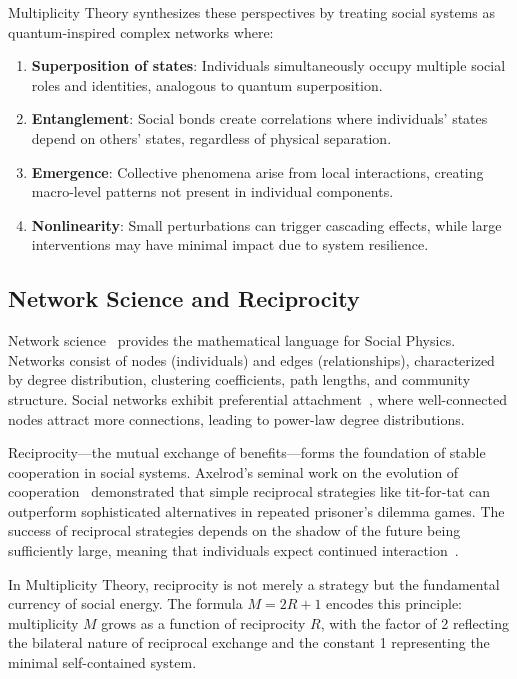 \documentclass[11pt,a4paper]{article}
\begin{document}
Multiplicity Theory synthesizes these perspectives by treating social systems as quantum-inspired complex networks where:

\begin{enumerate}
    \item \textbf{Superposition of states}: Individuals simultaneously occupy multiple social roles and identities, analogous to quantum superposition.
    \item \textbf{Entanglement}: Social bonds create correlations where individuals' states depend on others' states, regardless of physical separation.
    \item \textbf{Emergence}: Collective phenomena arise from local interactions, creating macro-level patterns not present in individual components.
    \item \textbf{Nonlinearity}: Small perturbations can trigger cascading effects, while large interventions may have minimal impact due to system resilience.
\end{enumerate}

\subsection{Network Science and Reciprocity}

Network science~\cite{barabasi2016,newman2010} provides the mathematical language for Social Physics. Networks consist of nodes (individuals) and edges (relationships), characterized by degree distribution, clustering coefficients, path lengths, and community structure. Social networks exhibit preferential attachment~\cite{barabasi1999}, where well-connected nodes attract more connections, leading to power-law degree distributions.

Reciprocity—the mutual exchange of benefits—forms the foundation of stable cooperation in social systems. Axelrod's seminal work on the evolution of cooperation~\cite{axelrod1984} demonstrated that simple reciprocal strategies like tit-for-tat can outperform sophisticated alternatives in repeated prisoner's dilemma games. The success of reciprocal strategies depends on the shadow of the future being sufficiently large, meaning that individuals expect continued interaction~\cite{axelrod1981}.

In Multiplicity Theory, reciprocity is not merely a strategy but the fundamental currency of social energy. The formula $M = 2R + 1$ encodes this principle: multiplicity $M$ grows as a function of reciprocity $R$, with the factor of 2 reflecting the bilateral nature of reciprocal exchange and the constant 1 representing the minimal self-contained system.
\end{document}
